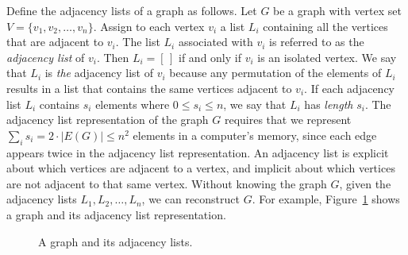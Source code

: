 Define the adjacency lists of a graph as follows. Let $G$ be a graph
with vertex set $V = \{v_1, v_2, \dots, v_n\}$. Assign to each vertex
$v_i$ a list $L_i$ containing all the vertices that are adjacent to
$v_i$. The list $L_i$ associated with $v_i$ is referred to as the
\emph{adjacency list} of $v_i$. Then $L_i = [\,]$ if and only if $v_i$
is an isolated vertex. We say that $L_i$ is \emph{the} adjacency list
of $v_i$ because any permutation of the elements of $L_i$ results in a
list that contains the same vertices adjacent to $v_i$. If each
adjacency list $L_i$ contains $s_i$ elements where
$0 \leq s_i \leq n$, we say that $L_i$ has \emph{length} $s_i$. The
adjacency list representation of the graph $G$ requires that we
represent $\sum_i s_i = 2 \cdot |E(G)| \leq n^2$ elements in a
computer's memory, since each edge appears twice in the adjacency list
representation. An adjacency list is explicit about which vertices are
adjacent to a vertex, and implicit about which vertices are not
adjacent to that same vertex. Without knowing the graph $G$, given the
adjacency lists $L_1, L_2, \dots, L_n$, we can reconstruct $G$. For
example, Figure~\ref{fig:graph_algorithms:graph_adjacency_lists} shows
a graph and its adjacency list representation.

\begin{figure}[!htbp]
\centering
{}
\caption{A graph and its adjacency lists.}
\label{fig:graph_algorithms:graph_adjacency_lists}
\end{figure}


